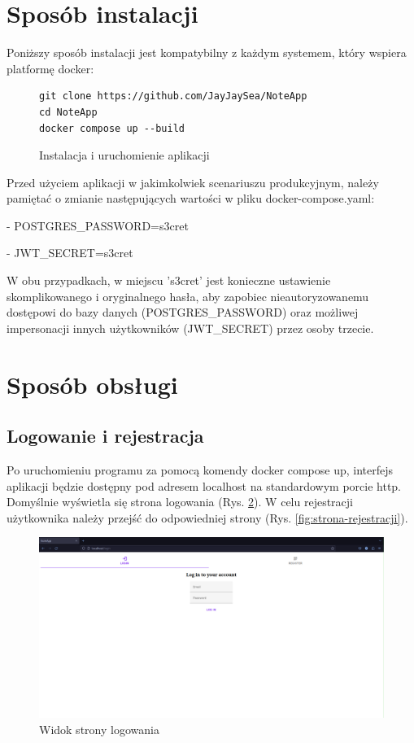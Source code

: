 \documentclass[a4paper,twoside,12pt]{book}
\begin{document}
\section{Sposób instalacji}
\label{sec:instalacja}

Poniższy sposób instalacji jest kompatybilny z każdym systemem, który wspiera
platformę docker:

\begin{figure}[H]
\centering
\begin{lstlisting}
git clone https://github.com/JayJaySea/NoteApp
cd NoteApp
docker compose up --build
\end{lstlisting}
\caption{Instalacja i uruchomienie aplikacji}
\label{fig:app-install}
\end{figure}

Przed użyciem aplikacji w jakimkolwiek scenariuszu produkcyjnym,
należy pamiętać o zmianie następujących wartości w pliku docker-compose.yaml:
 
- POSTGRES\_PASSWORD=s3cret 

- JWT\_SECRET=s3cret 

W obu przypadkach, w miejscu 's3cret' jest konieczne ustawienie skomplikowanego
i oryginalnego hasła, aby zapobiec nieautoryzowanemu dostępowi do 
bazy danych (POSTGRES\_PASSWORD) oraz możliwej impersonacji innych użytkowników
(JWT\_SECRET) przez osoby trzecie.

\section{Sposób obsługi}

\subsection{Logowanie i rejestracja}
Po uruchomieniu programu za pomocą komendy docker compose up, interfejs
aplikacji będzie dostępny pod adresem localhost na standardowym porcie http.
Domyślnie wyświetla się strona logowania (Rys. \ref{fig:strona-logowania}).
W celu rejestracji użytkownika należy przejść do odpowiedniej strony (Rys. \ref{fig:strona-rejestracji}).

\begin{figure}[H]
\centering
\includegraphics[width=1.0\textwidth]{./images/strona-logowania.png}
\caption{Widok strony logowania}
\label{fig:strona-logowania}
\end{figure}
\end{document}
